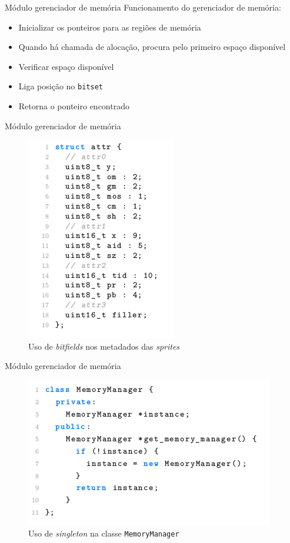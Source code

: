 \documentclass[notes, mathserif]{beamer}
\begin{document}
\begin{frame}{M\'odulo gerenciador de mem\'oria}
	Funcionamento do gerenciador de mem\'oria:
	\begin{itemize}
		\item Inicializar os ponteiros para as regi\~oes de mem\'oria
		\item Quando h\'a chamada de aloca\c c\~ao, procura pelo primeiro espa\c co dispon\'ivel
		\item Verificar espa\c co dispon\'ivel
		\item Liga posi\c c\~ao no \texttt{bitset}
		\item Retorna o ponteiro encontrado
	\end{itemize}
\end{frame}

\begin{frame}{M\'odulo gerenciador de mem\'oria}
	\begin{figure}[H]
		\includegraphics[width=.4\linewidth]{figuras/bitfield.png}
		\centering
		\caption{Uso de \textit{bitfields} nos metadados das \textit{sprites}}
		\label{fig:bitfield}
	\end{figure}
\end{frame}

\begin{frame}{M\'odulo gerenciador de mem\'oria}
	\begin{figure}[H]
		\includegraphics[width=.7\linewidth]{figuras/singleton.png}
		\centering
		\caption{Uso de \textit{singleton} na classe \texttt{MemoryManager}}
		\label{fig:singleton}
	\end{figure}
\end{frame}
\end{document}

